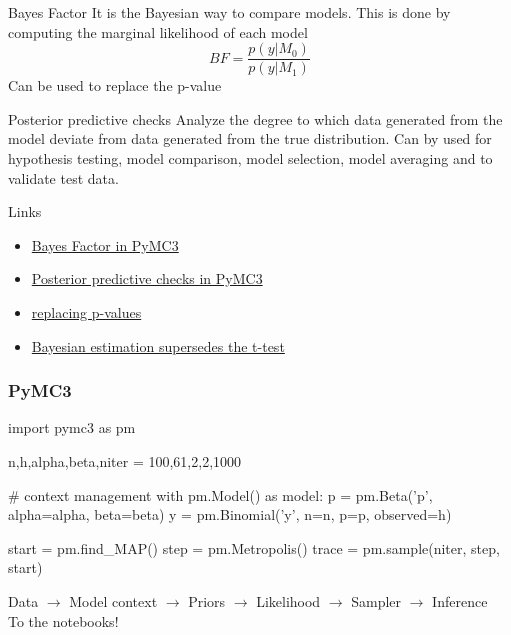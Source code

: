 \documentclass[table,dvipsnames]{beamer}
\newcommand{\keywd}{\textcolor{myorange}}
\newcommand{\highlt}{\textcolor{NavyBlue}}
\begin{document}
\begin{frame}[fragile]
 \footnotesize
 
 \begin{block}{Bayes Factor}
  It is the \keywd{Bayesian way} to compare models.   This is done by computing the marginal likelihood of each model 
  \begin{equation}
  BF = \frac{p(y|M_{0})}{p(y|M_{1})}
  \end{equation}
  \highlt{Can be used to replace the p-value}
 \end{block}

 \begin{block}{Posterior predictive checks}
  Analyze the degree to which data generated from the model deviate from data generated from the true distribution. Can by used for hypothesis testing, model comparison, model selection, model averaging and to validate test data.
 \end{block}

Links
\begin{itemize}
 \item \href{http://docs.pymc.io/notebooks/Bayes\_factor.html}{Bayes Factor in PyMC3}
 \item \href{http://docs.pymc.io/notebooks/posterior\_predictive.html}{Posterior predictive checks in PyMC3}
 \item \href{https://replicationindex.wordpress.com/2015/04/30/replacing-p-values-with-bayes-factors-a-miracle-cure-for-the-replicability-crisis-in-psychological-science/}{replacing p-values}
 \item \href{http://docs.pymc.io/notebooks/BEST.html}{Bayesian estimation supersedes the t-test}
\end{itemize}
\end{frame}



\begin{frame}[fragile]
\frametitle{PyMC3}
\footnotesize
\begin{code}
import pymc3 as pm

n,h,alpha,beta,niter = 100,61,2,2,1000

# context management
with pm.Model() as model: 
    p = pm.Beta('p', alpha=alpha, beta=beta)
    y = pm.Binomial('y', n=n, p=p, observed=h)

    start = pm.find_MAP()
    step = pm.Metropolis()
    trace = pm.sample(niter, step, start)
\end{code}

Data $\rightarrow$ Model context $\rightarrow$ Priors $\rightarrow$ Likelihood $\rightarrow$ Sampler $\rightarrow$ Inference
\vspace{0.5cm}
\\ \noindent To the notebooks!
\end{frame}
\end{document}
